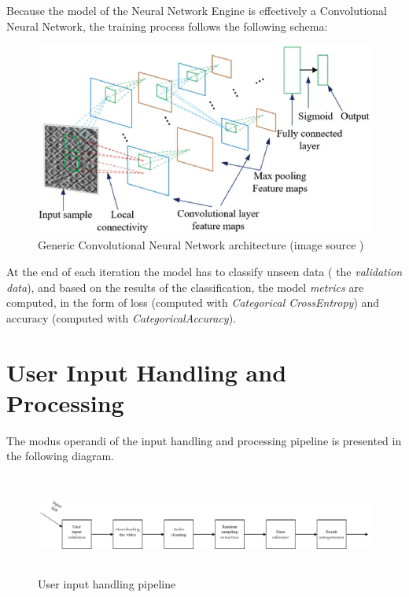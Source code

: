 Because the model of the Neural Network Engine is effectively a Convolutional Neural Network, the training process follows
the following schema:


\begin{figure}[H]
	\centering
	\includegraphics[width = 5.5in]{images/genericcnn.png}
	\caption{Generic Convolutional Neural Network architecture (image source \cite{cnna})}
\label{genarch}
\end{figure}

At the end of each iteration the model has to classify unseen data ( the \textit{validation data}), and based on the results of
the classification, the model \textit{metrics} are computed, in the form of loss (computed with \textit{Categorical CrossEntropy})
and accuracy (computed with \textit{CategoricalAccuracy}).


\section{User Input Handling and Processing}

The modus operandi of the input handling and processing pipeline is presented in the following diagram.

\begin{figure}[H]
	\centering
	\includegraphics[width = 6.5in,height=1.3in]{images/datapipe.png}
	\caption{User input handling pipeline}
\label{mo}
\end{figure}

